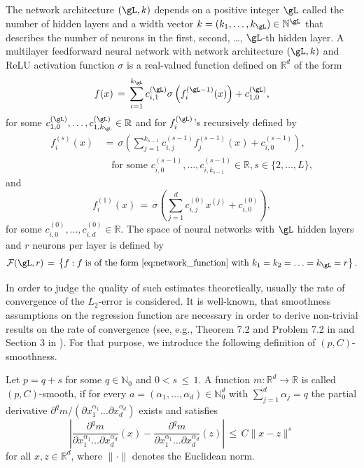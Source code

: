 \documentclass[twoside,11pt]{article}
\begin{document}
The network architecture \( (\gL, k) \) depends on a positive integer \( \gL \) called the number of hidden layers and a width vector \( k = (k_1, \ldots, k_{\gL}) \in \mathbb{N}^{\gL} \) that describes the number of neurons in the first, second, \ldots, \( \gL \)-th hidden layer. A multilayer feedforward neural network with network architecture \( (\gL, k) \) and ReLU activation function \( \sigma \) is a real-valued function defined on \( \mathbb{R}^d \) of the form
\begin{equation} \label{eq:network_function}
f(x) \,=\, \sum_{i=1}^{k_{\gL}} c_{i,1}^{(\gL)} \sigma \left( f_{i}^{(\gL-1)}(x) \right) + c_{1,0}^{(\gL)},
\end{equation}
for some \( c_{1,0}^{(\gL)}, \ldots, c_{1,k_{\gL}}^{(\gL)} \in \mathbb{R} \) and for \( f_i^{(\gL)} \)'s recursively defined by
\begin{align}
f_i^{(s)}(x) &\,=\, \sigma \left( \sum_{j=1}^{k_{s-1}} c_{i,j}^{(s-1)} f_j^{(s-1)}(x) + c_{i,0}^{(s-1)} \right), \\
&\quad \text{for some } c_{i,0}^{(s-1)}, \ldots, c_{i,k_{s-1}}^{(s-1)} \in \mathbb{R}, s \in \{2, \ldots, L\}, \nonumber
\end{align}
and
\begin{equation} \label{eq:first_layer_function}
f_i^{(1)}(x) \,=\, \sigma \left( \sum_{j=1}^d c_{i,j}^{(0)} x^{(j)} + c_{i,0}^{(0)} \right),
\end{equation}
for some \( c_{i,0}^{(0)}, \ldots, c_{i,d}^{(0)} \in \mathbb{R} \). The space of neural networks with \( \gL \) hidden layers and \( r \) neurons per layer is defined by
\begin{equation} \label{eq:space_of_networks}
\mathcal{F}(\gL,r) \,=\, \left\{ f : f \text{ is of the form \eqref{eq:network_function} with } k_1 = k_2 = \ldots = k_{\gL} = r \right\}.
\end{equation}

In order to judge the quality of such estimates theoretically, usually the rate of convergence of the \( L_2 \)-error is considered. It is well-known, that smoothness assumptions on the regression function are necessary in order to derive non-trivial results on the rate of convergence (see, e.g., Theorem 7.2 and Problem 7.2 in \cite{devroye2013probabilistic} and Section 3 in \cite{devroye1980distribution}). For that purpose, we introduce the following definition of \( (p, C) \)-smoothness.

\begin{definition}
Let \( p = q + s \) for some \( q \in \mathbb{N}_0 \) and \( 0 < s \,\leq\, 1 \). A function \( m : \mathbb{R}^d \rightarrow \mathbb{R} \) is called \( (p, C) \)-smooth, if for every \( a = (\alpha_1, \ldots, \alpha_d) \in \mathbb{N}_0^d \) with \( \sum_{j=1}^d \alpha_j = q \) the partial derivative \( \partial^qm / (\partial x_1^{\alpha_1} \ldots \partial x_d^{\alpha_d}) \) exists and satisfies
\[
\left| \frac{\partial^qm}{\partial x_1^{\alpha_1} \ldots \partial x_d^{\alpha_d}}(x) - \frac{\partial^qm}{\partial x_1^{\alpha_1} \ldots \partial x_d^{\alpha_d}}(z) \right| \,\leq\, C \|x - z\|^s
\]
for all \( x, z \in \mathbb{R}^d \), where \( \| \cdot \| \) denotes the Euclidean norm.
\end{definition}
\end{document}
